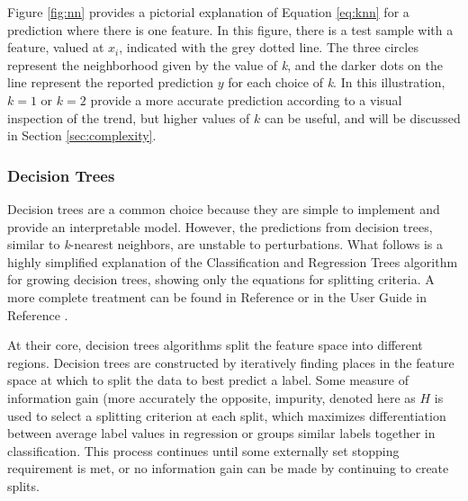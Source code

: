 Figure \ref{fig:nn} provides a pictorial explanation of Equation \ref{eq:knn}
for a prediction where there is one feature. In this figure, there is a test
sample with a feature, valued at $x_i$, indicated with the grey dotted line.
The three circles represent the neighborhood given by the value of \textit{k},
and the darker dots on the line represent the reported prediction $y$ for each
choice of \textit{k}.  In this illustration, $k=1$ or $k=2$ provide a more
accurate prediction according to a visual inspection of the trend, but higher
values of $k$ can be useful, and will be discussed in Section
\ref{sec:complexity}.

\subsubsection{Decision Trees}

Decision trees are a common choice because they are simple to implement and
provide an interpretable model. However, the predictions from decision trees,
similar to \textit{k}-nearest neighbors, are unstable to perturbations.  What
follows is a highly simplified explanation of the Classification and Regression
Trees algorithm for growing decision trees, showing only the equations for
splitting criteria.  A more complete treatment can be found in Reference
\cite{elements_stats} or in the User Guide in Reference \cite{scikit}.

At their core, decision trees algorithms split the feature space into different
regions.  Decision trees are constructed by iteratively finding places in the
feature space at which to split the data to best predict a label. Some measure
of information gain (more accurately the opposite, impurity, denoted here as
$H$ is used to select a splitting criterion at each split, which maximizes
differentiation between average label values in regression or groups similar
labels together in classification.  This process continues until some
externally set stopping requirement is met, or no information gain can be made
by continuing to create splits. 

